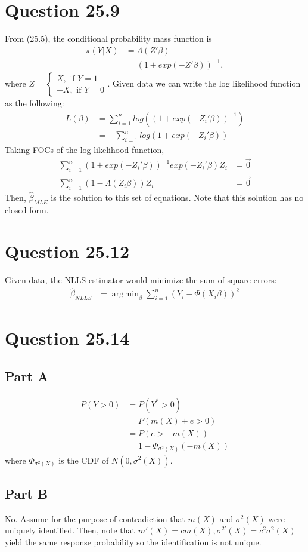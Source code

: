 \documentclass[11pt]{article} %
\DeclareMathOperator*{\argmin}{arg\,min}
\begin{document}
\section{Question 25.9}
From (25.5), the conditional probability mass function is
\begin{align*}
\pi(Y|X) &= \Lambda(Z'\beta)\\
&= (1+exp(-Z'\beta))^{-1},
\end{align*}
where $Z = \begin{cases} X, \text{ if } Y=1 \\ -X, \text{ if } Y=0 \end{cases}$. Given data we can write the log likelihood function as the following:
\begin{align*}
L(\beta) &= \sum_{i=1}^n log((1+exp(-Z_i'\beta))^{-1}) \\\
&= -\sum_{i=1}^n log(1+exp(-Z_i'\beta))
\end{align*}
Taking FOCs of the log likelihood function,
\begin{align*}
\sum_{i=1}^n (1+exp(-Z_i'\beta))^{-1}exp(-Z_i'\beta)Z_i &= \vec{0}\\
\sum_{i=1}^n (1-\Lambda(Z_i\beta))Z_i &= \vec{0}
\end{align*}
Then, $\hat{\beta}_{MLE}$ is the solution to this set of equations. Note that this solution has no closed form.
\section{Question 25.12}
Given data, the NLLS estimator would minimize the sum of square errors:
\begin{align*}
\hat{\beta}_{NLLS} &= \argmin_{\beta} \sum_{i=1}^n (Y_i - \Phi(X_i \beta))^2
\end{align*}
\section{Question 25.14}
\subsection{Part A}
\begin{align*}
P(Y>0) &= P(Y^{*}>0)\\
&= P(m(X) + e >0)\\
&= P(e>-m(X))\\
&= 1-\Phi_{\sigma^2(X)}(-m(X))
\end{align*}
where $\Phi_{\sigma^2(X)}$ is the CDF of $N(0,\sigma^2(X))$.
\subsection{Part B}
No. Assume for the purpose of contradiction that $m(X)$ and $\sigma^2(X)$ were uniquely identified. Then, note that $m'(X) = cm(X), \sigma^{2'}(X) = c^2\sigma^2(X)$  yield the same response probability so the identification is not unique.
\end{document}
